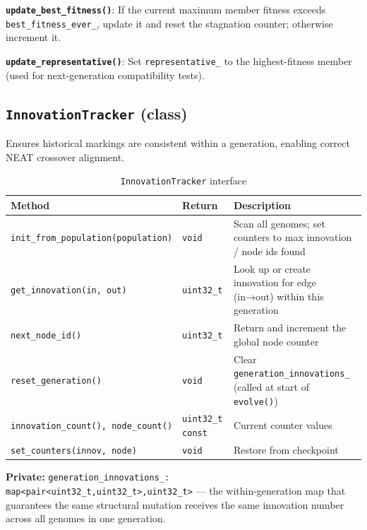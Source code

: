 \textbf{\texttt{update\_best\_fitness()}}: If the current maximum member fitness exceeds
\texttt{best\_fitness\_ever\_}, update it and reset the stagnation counter; otherwise
increment it.

\textbf{\texttt{update\_representative()}}: Set \texttt{representative\_} to the
highest-fitness member (used for next-generation compatibility tests).

\subsection{\texttt{InnovationTracker} (class)}

Ensures historical markings are consistent within a generation, enabling correct NEAT
crossover alignment.

\begin{table}[H]
\centering\small
\caption{\texttt{InnovationTracker} interface}
\begin{tabularx}{\textwidth}{@{}llX@{}}
\toprule
\textbf{Method} & \textbf{Return} & \textbf{Description} \\
\midrule
\texttt{init\_from\_population(population)} & \texttt{void} & Scan all genomes; set counters to max innovation / node ids found \\
\texttt{get\_innovation(in, out)} & \texttt{uint32\_t} & Look up or create innovation for edge (in→out) within this generation \\
\texttt{next\_node\_id()} & \texttt{uint32\_t} & Return and increment the global node counter \\
\texttt{reset\_generation()} & \texttt{void} & Clear \texttt{generation\_innovations\_} (called at start of \texttt{evolve()}) \\
\texttt{innovation\_count(), node\_count()} & \texttt{uint32\_t const} & Current counter values \\
\texttt{set\_counters(innov, node)} & \texttt{void} & Restore from checkpoint \\
\bottomrule
\end{tabularx}
\end{table}

\textbf{Private:} \texttt{generation\_innovations\_: map<pair<uint32\_t,uint32\_t>,uint32\_t>}
— the within-generation map that guarantees the same structural mutation receives the
same innovation number across all genomes in one generation.


